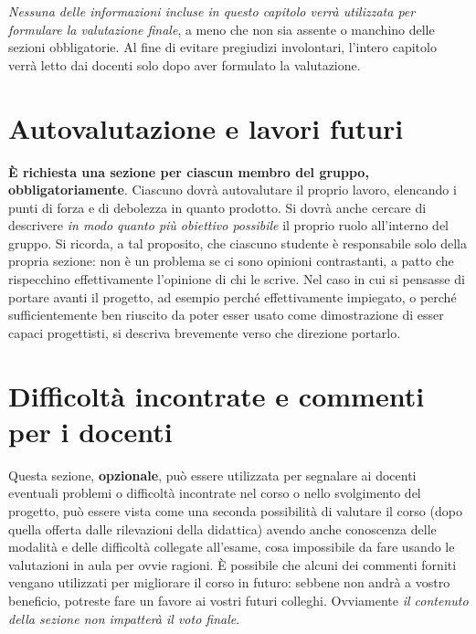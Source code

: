 \documentclass[a4paper,12pt]{report}
\begin{document}
\textit{Nessuna delle informazioni incluse in questo capitolo verrà utilizzata per formulare la valutazione finale}, a meno che non sia assente o manchino delle sezioni obbligatorie.
%
Al fine di evitare pregiudizi involontari, l'intero capitolo verrà letto dai docenti solo dopo aver formulato la valutazione.

\section{Autovalutazione e lavori futuri}

\textbf{È richiesta una sezione per ciascun membro del gruppo, obbligatoriamente}.
%
Ciascuno dovrà autovalutare il proprio lavoro, elencando i punti di forza e di debolezza in quanto prodotto.
Si dovrà anche cercare di descrivere \emph{in modo quanto più obiettivo possibile} il proprio ruolo all'interno del gruppo.
Si ricorda, a tal proposito, che ciascuno studente è responsabile solo della propria sezione: non è un problema se ci sono opinioni contrastanti, a patto che rispecchino effettivamente l'opinione di chi le scrive.
Nel caso in cui si pensasse di portare avanti il progetto, ad esempio perché effettivamente impiegato, o perché sufficientemente ben riuscito da poter esser usato come dimostrazione di esser capaci progettisti, si descriva brevemente verso che direzione portarlo.

\section{Difficoltà incontrate e commenti per i docenti}

Questa sezione, \textbf{opzionale}, può essere utilizzata per segnalare ai docenti eventuali problemi o difficoltà incontrate nel corso o nello svolgimento del progetto, può essere vista come una seconda possibilità di valutare il corso (dopo quella offerta dalle rilevazioni della didattica) avendo anche conoscenza delle modalità e delle difficoltà collegate all'esame, cosa impossibile da fare usando le valutazioni in aula per ovvie ragioni.
%
È possibile che alcuni dei commenti forniti vengano utilizzati per migliorare il corso in futuro: sebbene non andrà a vostro beneficio, potreste fare un favore ai vostri futuri colleghi.
%
Ovviamente \textit{il contenuto della sezione non impatterà il voto finale}.
\end{document}
